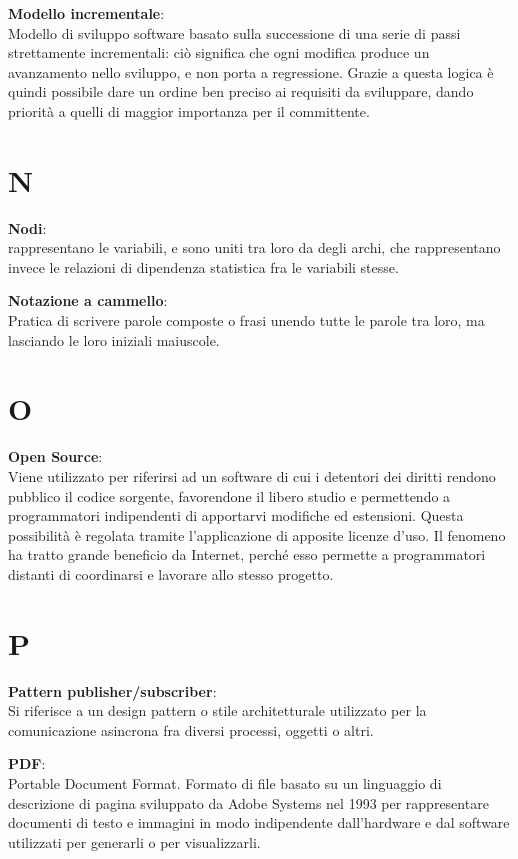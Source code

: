\documentclass[a4paper, oneside, openany, dvipsnames, table]{article}
\begin{document}
\textbf{Modello incrementale}:\\Modello di sviluppo software basato sulla successione di una serie di passi strettamente incrementali: ciò significa che ogni modifica produce un avanzamento nello sviluppo, e non porta a regressione. Grazie a questa logica è quindi possibile dare un ordine ben preciso ai requisiti da sviluppare, dando priorità a quelli di maggior importanza per il committente.


\newpage
\section{N}
\textbf{Nodi}:\\
[In una rete Bayesiana] rappresentano le variabili, e sono uniti tra loro da degli archi, che rappresentano invece le relazioni di dipendenza statistica fra le variabili stesse.

\textbf{Notazione a cammello}:\\	Pratica di scrivere parole composte o frasi unendo tutte le parole tra loro, ma lasciando le loro iniziali maiuscole.

\newpage
\section{O}
\textbf{Open Source}:\\	Viene utilizzato per riferirsi ad un software di cui i detentori dei diritti rendono pubblico il codice sorgente, favorendone il libero studio e permettendo a programmatori indipendenti di apportarvi modifiche ed estensioni. Questa possibilità è regolata tramite l'applicazione di apposite licenze d'uso. Il fenomeno ha tratto grande beneficio da Internet, perché esso permette a programmatori distanti di coordinarsi e lavorare allo stesso progetto.

\newpage
\section{P}
\textbf{Pattern publisher/subscriber}:\\	 Si riferisce a un design pattern o stile architetturale utilizzato per la comunicazione asincrona fra diversi processi, oggetti o altri.

\textbf{PDF}:\\	Portable Document Format. Formato di file basato su un linguaggio di descrizione di pagina sviluppato da Adobe Systems nel 1993 per rappresentare documenti di testo e immagini in modo indipendente dall'hardware e dal software utilizzati per generarli o per visualizzarli.
\end{document}
